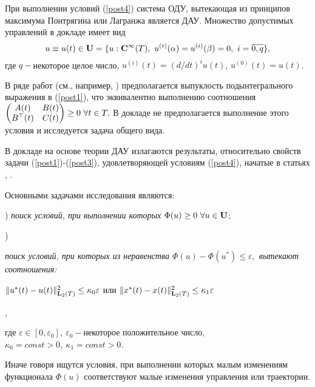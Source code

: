 При выполнении условий (\ref{post4}) система ОДУ, вытекающая из принципов максимума Понтрягина или Лагранжа является ДАУ.
Множество допустимых управлений в докладе имеет вид
\begin{equation}\label{post31}
u\equiv u(t)\in {\bf U}=\{u: {\bf C}^{\infty }(T), \ u^{(i)}(\alpha )=u^{(i)}(\beta )=0,\ i=\overline{0,q}\},
\end{equation}
где  $q-$некоторое целое число, $u^{(i)}(t)=(d/dt)^iu(t)$, $u^{(0)}(t)=u(t)$.



В ряде работ (см., например, \cite{kurmerz}) предполагается выпуклость
подынтегрального выражения в (\ref{post1}), что эквивалентно выполнению
соотношения
$
\begin{pmatrix}{A}(t) & {B(t)}\cr  {B}^\top(t) &
	{C}(t)\end{pmatrix}\geq 0\ \forall t\in T.
$
В докладе не предполагается выполнение этого условия и исследуется задача общего вида.

В докладе на основе теории ДАУ излагаются результаты, относительно свойств задачи (\ref{post1})-(\ref{post3}), удовлетворяющей условиям (\ref{post4}), начатые в статьях \cite{chistpesh}, \cite{chist2Fu2020}.

Основными задачами исследования являются:
\par {}) {\it  поиск условий, при выполнении которых  $\Phi (u)\geq 0\ \forall u\in {\bf U}$};
\par {})
{\it поиск условий, при  которых из неравенства $\Phi (u)-\Phi (u^\ast)\leq \varepsilon ,$
	вытекают соотношения:\\ \centerline {$\Vert u^\ast(t)-u(t)\Vert _{{\bf L}_{2}(T)}^2\leq \kappa_0 \varepsilon $ или $\Vert x^\ast(t)-x(t)\Vert _{{\bf L}_{2}(T)}^2\leq \kappa_1\varepsilon $},
	\vskip 0.15cm
	\par \noindent
	где $\varepsilon\in [0,\varepsilon_0],\ \varepsilon_0 -$некоторое положительное число,
	$\kappa_0= const>0,\  \kappa_1= const>0$.}

Иначе говоря ищутся условия, при выполнении которых малым изменениям
функционала $\Phi (u)$ соответствуют малые  изменения управления или траектории.


